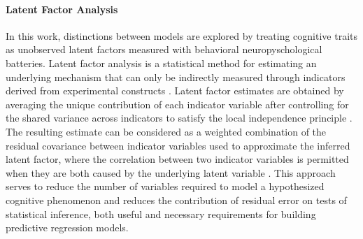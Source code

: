 \documentclass[utf8]{frontiersSCNS} %
\begin{document}
\paragraph*{Latent Factor Analysis} In this work, distinctions between models are explored by treating cognitive traits as unobserved latent factors measured with behavioral neuropyschological batteries. Latent factor analysis is a statistical method for estimating an underlying mechanism that can only be indirectly measured through indicators derived from experimental constructs \citep{finch2015latent}. Latent factor estimates are obtained by averaging the unique contribution of each indicator variable after controlling for the shared variance across indicators to satisfy the local independence principle \citep{sobel1997measurement}. The resulting estimate can be considered as a weighted combination of the residual covariance between indicator variables used to approximate the inferred latent factor, where the correlation between two indicator variables is permitted when they are both caused by the underlying latent variable \citep{cooper2019neuroimaging}. This approach serves to reduce the number of variables required to model a hypothesized cognitive phenomenon and reduces the contribution of residual error on tests of statistical inference, both useful and necessary requirements for building predictive regression models.
\end{document}
